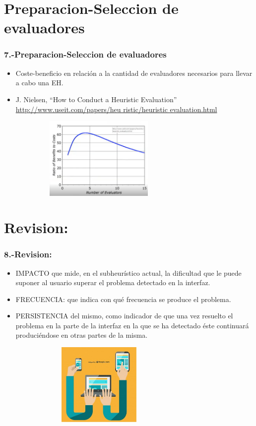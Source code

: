 \documentclass[11pt]{beamer}
\begin{document}
\section{Preparacion-Seleccion de evaluadores}
\begin{frame}
\frametitle{7.-Preparacion-Seleccion de evaluadores}

\begin{itemize}
\item Coste-beneficio en relación a la cantidad de evaluadores necesarios para llevar a cabo una EH.
\item J. Nielsen, “How to Conduct a Heuristic Evaluation”\\
\url{http://www.useit.com/papers/heu ristic/heuristic evaluation.html}
\end{itemize}

\begin{figure}
  \centering
  \includegraphics[width=8.0cm,height=4.0cm]{img/image_4.png}
\end{figure}
\end{frame}

\section{Revision:}
\begin{frame}
\frametitle{8.-Revision:}

\begin{itemize}
\item IMPACTO que mide, en el subheurístico actual, la dificultad que le puede suponer al usuario superar el problema detectado en la interfaz.
\item FRECUENCIA: que indica con qué frecuencia se produce el problema.
\item PERSISTENCIA del mismo, como indicador de que una vez resuelto el problema en la parte de la interfaz en la que se ha detectado éste continuará produciéndose en otras partes de la misma.
\end{itemize}

\begin{figure}
  \centering
  \includegraphics[width=8.0cm,height=4.0cm]{img/image_1.jpg}
\end{figure}
\end{frame}
\end{document}
